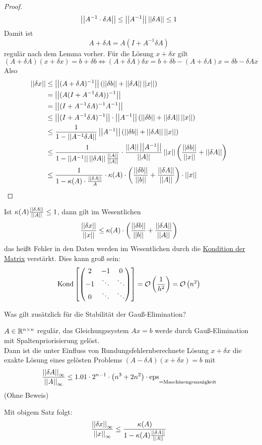 \documentclass[../Skript.tex]{subfiles}
\begin{document}
\begin{proof}
    \[\dabs{A^{-1}\cdot \delta A}\leq\dabs{A^{-1}}\dabs{\delta A}\leq 1\] Damit ist \[A+\delta A = A(I+A^{-1}\delta A) \] regulär nach dem Lemma vorher.
    Für die Lösung \(x+\delta x\) gilt \[
    (A+\delta A)(x+\delta x)=b+\delta b \Leftrightarrow (A+\delta A)\delta x = b+\delta b- (A+\delta A)x= \delta b-\delta Ax
    \]
    Also \begin{align*}
        \dabs{\delta x}&\leq \dabs{(A+\delta A)^{-1}} \left(\dabs{\delta b} + \dabs{\delta A}\dabs{x}\right)\\
        &= \dabs{(A(I+A^{-1}\delta A))^{-1}} \\
        &= \dabs{(I+A^{-1}\delta A)^{-1}A^{-1}}\\
        &\leq \dabs{(I+A^{-1} \delta A)^{-1}} \cdot \dabs{A^{-1}}(\dabs{\delta b} + \dabs{\delta A}\dabs{x})\\
        &\leq \frac{1}{1-\dabs{A^{-1}\delta A}}\dabs{A^{-1}}(\dabs{\delta b} + \dabs{\delta A}\dabs{x})\\
        &\leq \frac{1}{1-\dabs{A^{-1}} \dabs{\delta A} \frac{\dabs{A}}{\dabs{A}}}\cdot \frac{\dabs{A} \dabs{A^{-1}}}{\dabs{A}}\dabs{x}\left(\frac{\dabs{\delta b}}{\dabs{x}} + \dabs{\delta A}\right)\\
        &\leq \frac{1}{1-\kappa(A)\cdot \frac{\dabs{\delta A}}{A}}\cdot \kappa(A) \cdot \left(\frac{\dabs{\delta b}}{\dabs{b}} + \frac{\dabs{\delta A}}{\dabs{A}}\right)\cdot \dabs{x}
    \end{align*}
\end{proof}
\begin{remark}
    Ist $\kappa(A) \frac{\dabs{\delta A}}{\dabs{A}}\leq 1$, dann gilt im Wesentlichen
    \[
        \frac{\dabs{\delta x}}{\dabs{x}} \leq \kappa(A)\cdot \left(\frac{\dabs{\delta b}}{\dabs{b}} + \frac{\dabs{\delta A}}{\dabs{A}}\right)\]
    das heißt Fehler in den Daten werden im Wesentlichen durch die \underline{Kondition
    der Matrix} verstärkt. Dies kann groß sein:\[
        \text{Kond}\left[\matrx{2&-1&0\\-1&\ddots & \ddots \\
        0&\ddots & \ddots }\right] = \calO{\frac{1}{h^2}} = \calO{n^2}\]
\end{remark}

Was gilt zusätzlich für die Stabilität der Gauß-Elimination?
\begin{theorem}[Rundungsfehlereinfluss]

    \(A\in \R^{n\times n}\) regulär, das Gleichungssystem \(Ax=b\) werde durch
    Gauß-Elimination mit Spaltenpriorisierung gelöst.\\
    Dann ist die unter Einfluss von Rundungsfehlernberechnete Lösung \(x+\delta x\)
    die exakte Lösung eines gelösten Problems \((A-\delta A)(x+\delta x)=b\)
    mit \[\frac{\dabs{\delta A}_\infty}{\dabs{A}_\infty}\leq 1.01\cdot 2^{n-1}\cdot
    \left(n^3+2n^2\right)\cdot \text{eps}\underset{=\text{Maschinengenauigkeit}}{\ }\]
    (Ohne Beweis)
\end{theorem}
Mit obigem Satz folgt:\\
\[\frac{\dabs{\delta x}_\infty}{\dabs{x}_\infty}\leq \frac{\kappa(A)}
{1-\kappa(A)\frac{\dabs{\delta A}}{\dabs{A}}}\]
\end{document}
